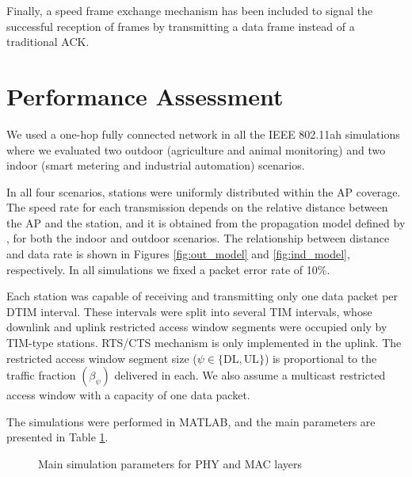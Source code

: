 \documentclass[]{article}
\newcommand{\UL}{\text{UL}}
\newcommand{\DL}{\text{DL}}
\begin{document}
Finally, a speed frame exchange \cite{Draft802.11ah} mechanism has been included to signal the successful reception of frames by transmitting a data frame instead of a traditional ACK.



\section{Performance Assessment}
\label{proposal}

We used a one-hop fully connected network in all the IEEE 802.11ah simulations where we evaluated two outdoor (agriculture and animal monitoring) and two indoor (smart metering and industrial automation) scenarios.





In all four scenarios, stations were uniformly distributed within the AP coverage. The speed rate for each transmission depends on the relative distance between the AP and the station, and it is obtained from the propagation model defined by \cite{Hazmi2012}, for both the indoor and outdoor scenarios. The relationship between distance and data rate is shown in Figures \ref{fig:out_model} and \ref{fig:ind_model}, respectively. In all simulations we fixed a packet error rate of 10\%.

Each station was capable of receiving and transmitting only one data packet per DTIM interval. These intervals were split into several TIM intervals, whose downlink and uplink restricted access window segments were occupied only by TIM-type stations. RTS/CTS mechanism is only implemented in the uplink. The restricted access window segment size ($\psi \in \lbrace \DL,\UL\rbrace$) is proportional to the traffic fraction $(\beta_{\psi})$ delivered in each. We also assume a multicast restricted access window with a capacity of one data packet.

The simulations were performed in MATLAB, and the main parameters are presented in Table \ref{fig:sim_param}.

\renewcommand{\figurename}{Table}\setcounter{figure}{1}
\begin{figure}
\begin{center}
\end{center}
\caption{Main simulation parameters for PHY and MAC layers}
\label{fig:sim_param}
\end{figure}
\end{document}
